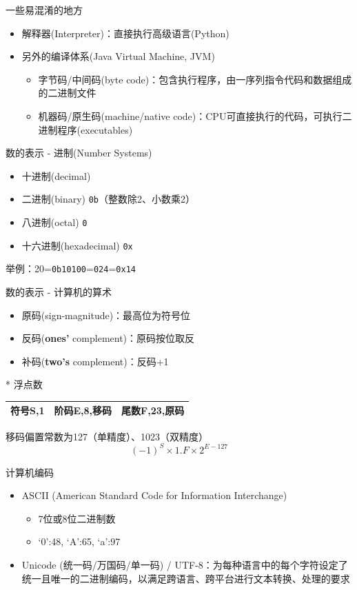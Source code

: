 \documentclass[UTF8]{ctexbeamer}
\begin{document}
\begin{frame}{一些易混淆的地方}
\begin{itemize}
	\item<1-> 解释器(Interpreter)：直接执行高级语言(Python)
	\item<2-> 另外的编译体系(Java Virtual Machine, JVM)
	\begin{itemize}
		\item 字节码/中间码(byte code)：包含执行程序，由一序列指令代码和数据组成的二进制文件
		\item 机器码/原生码(machine/native code)：CPU可直接执行的代码，可执行二进制程序(executables)
	\end{itemize}
\end{itemize}
\end{frame}

\begin{frame}[fragile]{数的表示 - 进制(Number Systems)}
\begin{itemize}
	\item 十进制(decimal)
	\item 二进制(binary) \verb'0b'（整数除2、小数乘2）
	\item 八进制(octal) \verb'0'
	\item 十六进制(hexadecimal) \verb'0x'
\end{itemize}
举例：20=\verb'0b10100'=\verb'024'=\verb'0x14'
\end{frame}

\begin{frame}{数的表示 - 计算机的算术}
\begin{itemize}
	\item 原码(sign-magnitude)：最高位为符号位
	\item 反码(\textbf{ones'} complement)：原码按位取反
	\item 补码(\textbf{two's} complement)：反码+1
\end{itemize}
\pause
* 浮点数
\begin{center}
\begin{tabular}{|c|c|c|}\hline
符号S,1 & 阶码E,8,移码 & 尾数F,23,原码
\\\hline
\end{tabular}
\end{center}
移码偏置常数为127（单精度）、1023（双精度）
\[(-1)^S\times1.F\times 2^{E-127}\]
\end{frame}

\begin{frame}{计算机编码}
\begin{itemize}
	\item ASCII (American Standard Code for Information Interchange)
	\begin{itemize}
		\item 7位或8位二进制数
		\item `0':48, `A':65, `a':97
	\end{itemize}
	\item Unicode (统一码/万国码/单一码) / UTF-8：为每种语言中的每个字符设定了统一且唯一的二进制编码，以满足跨语言、跨平台进行文本转换、处理的要求
\end{itemize}
\end{frame}
\end{document}

